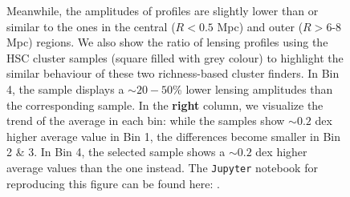 \documentclass[fleqn,usenatbib,useAMS]{mnras}
\begin{document}
\begin{figure}
{        Meanwhile, the amplitudes of \redm{} \dsigma{} profiles are slightly lower than or
        similar to the  ones in the central ($R < 0.5$ Mpc) and outer
        ($R>6$-8 Mpc) regions.
        We also show the ratio of lensing profiles using the HSC \camira{} cluster samples
        (square filled with grey colour) to highlight the similar behaviour of these two
        richness-based cluster finders.
        In Bin 4, the \redm{} sample displays a $\sim 20-50$\% lower lensing amplitudes than
        the corresponding  sample.
        In the \textbf{right} column, we visualize the trend of the average \mvir{} in each bin:
        while the \redm{} samples show $\sim 0.2$ dex higher average \mvir{} value in Bin 1,
        the differences become smaller in Bin 2 \& 3.
        In Bin 4, the  selected sample shows a $\sim 0.2$ dex higher average
        \mvir{} values than the \redm{} one instead.
        The \texttt{Jupyter} notebook for reproducing this figure can be found here:
        \href{https://github.com/dr-guangtou/jianbing/blob/master/notebooks/figure/fig9.ipynb}{\faGithub}.
        }
    \label{fig:mout_richness}
\end{figure}
\end{document}
